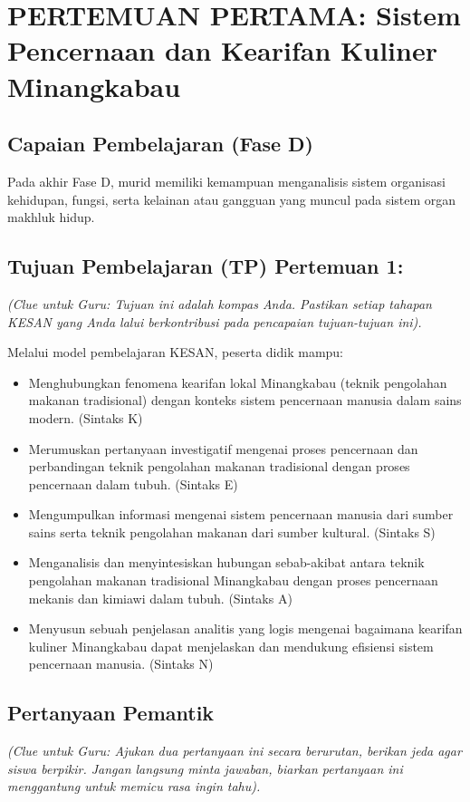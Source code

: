 \documentclass[a4paper,12pt]{article}
\begin{document}
\section{PERTEMUAN PERTAMA: Sistem Pencernaan dan Kearifan Kuliner Minangkabau}

\subsection{Capaian Pembelajaran (Fase D)}
Pada akhir Fase D, murid memiliki kemampuan menganalisis sistem organisasi kehidupan, fungsi, serta kelainan atau gangguan yang muncul pada sistem organ makhluk hidup.

\subsection{Tujuan Pembelajaran (TP) Pertemuan 1:}
\textit{(Clue untuk Guru: Tujuan ini adalah kompas Anda. Pastikan setiap tahapan KESAN yang Anda lalui berkontribusi pada pencapaian tujuan-tujuan ini).}

Melalui model pembelajaran KESAN, peserta didik mampu:
\begin{itemize}
\item Menghubungkan fenomena kearifan lokal Minangkabau (teknik pengolahan makanan tradisional) dengan konteks sistem pencernaan manusia dalam sains modern. (Sintaks K)
\item Merumuskan pertanyaan investigatif mengenai proses pencernaan dan perbandingan teknik pengolahan makanan tradisional dengan proses pencernaan dalam tubuh. (Sintaks E)
\item Mengumpulkan informasi mengenai sistem pencernaan manusia dari sumber sains serta teknik pengolahan makanan dari sumber kultural. (Sintaks S)
\item Menganalisis dan menyintesiskan hubungan sebab-akibat antara teknik pengolahan makanan tradisional Minangkabau dengan proses pencernaan mekanis dan kimiawi dalam tubuh. (Sintaks A)
\item Menyusun sebuah penjelasan analitis yang logis mengenai bagaimana kearifan kuliner Minangkabau dapat menjelaskan dan mendukung efisiensi sistem pencernaan manusia. (Sintaks N)
\end{itemize}

\subsection{Pertanyaan Pemantik}
\textit{(Clue untuk Guru: Ajukan dua pertanyaan ini secara berurutan, berikan jeda agar siswa berpikir. Jangan langsung minta jawaban, biarkan pertanyaan ini menggantung untuk memicu rasa ingin tahu).}
\end{document}

